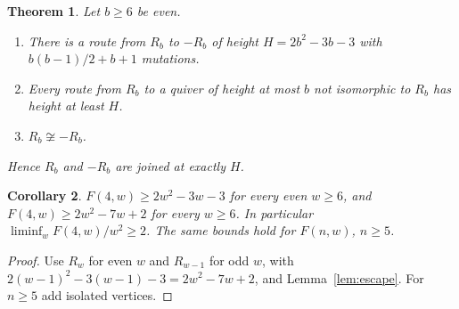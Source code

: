 \documentclass[11pt]{amsart}
\newtheorem{theorem}{Theorem}[section]
\newtheorem{corollary}[theorem]{Corollary}
\theoremstyle{definition}
\theoremstyle{remark}
\begin{document}
\begin{theorem}\label{thm:rb}
Let $b\ge6$ be even.
\begin{enumerate}
\item There is a route from $R_b$ to $-R_b$ of height $H=2b^2-3b-3$ with $b(b-1)/2+b+1$ mutations.
\item Every route from $R_b$ to a quiver of height at most $b$ not isomorphic to $R_b$ has height at least $H$.
\item $R_b\not\cong-R_b$.
\end{enumerate}
Hence $R_b$ and $-R_b$ are joined at exactly $H$.
\end{theorem}

\begin{corollary}\label{cor:rb}
$F(4,w)\ge2w^2-3w-3$ for every even $w\ge6$, and $F(4,w)\ge2w^2-7w+2$ for every $w\ge6$. In particular $\liminf_w F(4,w)/w^2\ge2$. The same bounds hold for $F(n,w)$, $n\ge5$.
\end{corollary}
\begin{proof}
Use $R_w$ for even $w$ and $R_{w-1}$ for odd $w$, with $2(w-1)^2-3(w-1)-3=2w^2-7w+2$, and Lemma~\ref{lem:escape}. For $n\ge5$ add isolated vertices.
\end{proof}
\end{document}
